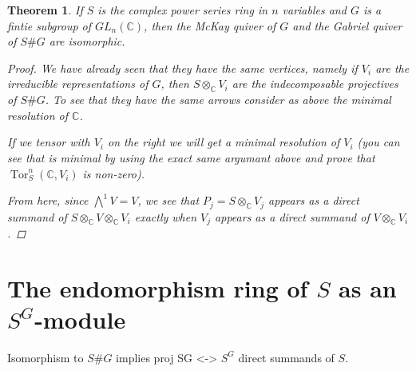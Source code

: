 \documentclass[11pt, a4paper, english]{article}
\numberwithin{prop}{section}
\numberwithin{lemma}{section}
\newtheorem{theorem}{Theorem}
\numberwithin{theorem}{section}
\numberwithin{defin}{section}
\numberwithin{example}{section}
\newcommand{\C}{\mathbb{C}}
\DeclareMathOperator{\Tor}{Tor}
\begin{document}
\begin{theorem}
If $S$ is the complex power series ring in $n$ variables and $G$ is a fintie subgroup of $GL_n(\C)$, then the McKay quiver of $G$ and the Gabriel quiver of $S\#G$ are isomorphic.
\begin{proof}
We have already seen that they have the same vertices, namely if $V_i$ are the irreducible representations of $G$, then $S \otimes_\C V_i$ are the indecomposable projectives of $S\#G$. To see that they have the same arrows consider as above the minimal resolution of $\C$.
\begin{center}
\end{center}
If we tensor with $V_i$ on the right we will get a minimal resolution of $V_i$ (you can see that is minimal by using the exact same argumant above and prove that $\Tor^n_S(\C, V_i)$ is non-zero).
\begin{center}
\end{center}
From here, since $\bigwedge\limits^{1} V = V$, we see that $P_j = S \otimes_\C V_j$ appears as a direct summand of $S \otimes_\C V \otimes_\C V_i$ exactly when $V_j$ appears as a direct summand of $V \otimes_\C V_i$.
\end{proof}
\end{theorem}

\section{The endomorphism ring of $S$ as an $S^G$-module}
Isomorphism to $S\#G$ implies proj SG <-> $S^G$ direct summands of $S$.
\end{document}
